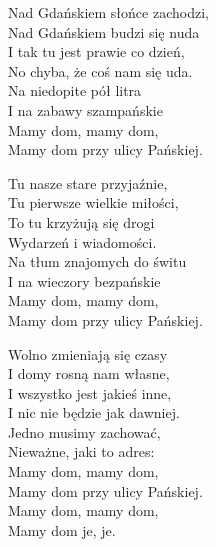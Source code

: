 \begin{text}
    Nad Gdańskiem słońce zachodzi,\\
    Nad Gdańskiem budzi się nuda\\
    I tak tu jest prawie co dzień,\\
    No chyba, że coś nam się uda.\\
    Na niedopite pół litra\\
    I na zabawy szampańskie\\
    \vin Mamy dom, mamy dom,\\
    \vin Mamy dom przy ulicy Pańskiej.

    Tu nasze stare przyjaźnie,\\
    Tu pierwsze wielkie miłości,\\
    To tu krzyżują się drogi\\
    Wydarzeń i wiadomości.\\
    Na tłum znajomych do świtu\\
    I na wieczory bezpańskie\\
    \vin Mamy dom, mamy dom,\\
    \vin Mamy dom przy ulicy Pańskiej.

    Wolno zmieniają się czasy\\
    I domy rosną nam własne,\\
    I wszystko jest jakieś inne,\\
    I nic nie będzie jak dawniej.\\
    Jedno musimy zachować,\\
    Nieważne, jaki to adres:\\
    \vin Mamy dom, mamy dom,\\
    \vin Mamy dom przy ulicy Pańskiej.\\
    \vin Mamy dom, mamy dom,\\
    \vin Mamy dom je, je.
\end{text}
